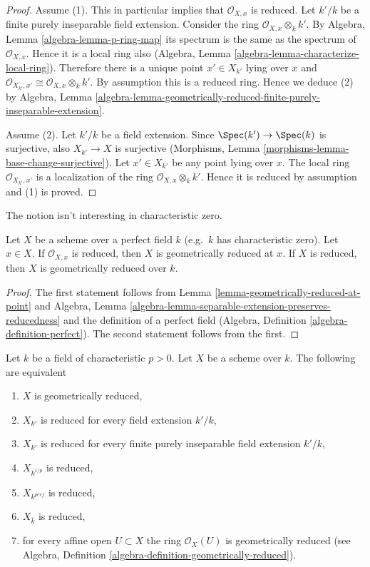 \begin{proof}
Assume (1). This in particular implies that $\mathcal{O}_{X, x}$
is reduced. Let $k'/k$ be a finite purely inseparable field
extension. Consider the ring $\mathcal{O}_{X, x} \otimes_k k'$.
By Algebra, Lemma \ref{algebra-lemma-p-ring-map}
its spectrum is the same as the spectrum of $\mathcal{O}_{X, x}$.
Hence it is a local ring also
(Algebra, Lemma \ref{algebra-lemma-characterize-local-ring}).
Therefore there is a unique point $x' \in X_{k'}$ lying over $x$
and $\mathcal{O}_{X_{k'}, x'} \cong \mathcal{O}_{X, x} \otimes_k k'$.
By assumption this is a reduced ring. Hence we deduce (2) by
Algebra, Lemma
\ref{algebra-lemma-geometrically-reduced-finite-purely-inseparable-extension}.

\medskip\noindent
Assume (2). Let $k'/k$ be a field extension. Since
$\Spec(k') \to \Spec(k)$ is surjective, also
$X_{k'} \to X$ is surjective
(Morphisms, Lemma \ref{morphisms-lemma-base-change-surjective}).
Let $x' \in X_{k'}$ be any point lying over $x$.
The local ring $\mathcal{O}_{X_{k'}, x'}$
is a localization of the ring $\mathcal{O}_{X, x} \otimes_k k'$.
Hence it is reduced by assumption and (1) is proved.
\end{proof}

\noindent
The notion isn't interesting in characteristic zero.

\begin{lemma}
\label{lemma-perfect-reduced}
Let $X$ be a scheme over a perfect field $k$ (e.g.\ $k$ has
characteristic zero). Let $x \in X$. If $\mathcal{O}_{X, x}$ is
reduced, then $X$ is geometrically reduced at $x$.
If $X$ is reduced, then $X$ is geometrically reduced over $k$.
\end{lemma}

\begin{proof}
The first statement follows from
Lemma \ref{lemma-geometrically-reduced-at-point} and
Algebra, Lemma \ref{algebra-lemma-separable-extension-preserves-reducedness}
and the definition of a perfect field
(Algebra, Definition \ref{algebra-definition-perfect}).
The second statement follows from the first.
\end{proof}

\begin{lemma}
\label{lemma-geometrically-reduced}
Let $k$ be a field of characteristic $p > 0$. Let $X$ be a scheme over $k$.
The following are equivalent
\begin{enumerate}
\item $X$ is geometrically reduced,
\item $X_{k'}$ is reduced for every field extension $k'/k$,
\item $X_{k'}$ is reduced for every finite purely inseparable field extension
$k'/k$,
\item $X_{k^{1/p}}$ is reduced,
\item $X_{k^{perf}}$ is reduced,
\item $X_{\bar k}$ is reduced,
\item for every affine open $U \subset X$ the ring $\mathcal{O}_X(U)$
is geometrically reduced (see
Algebra, Definition \ref{algebra-definition-geometrically-reduced}).
\end{enumerate}
\end{lemma}


